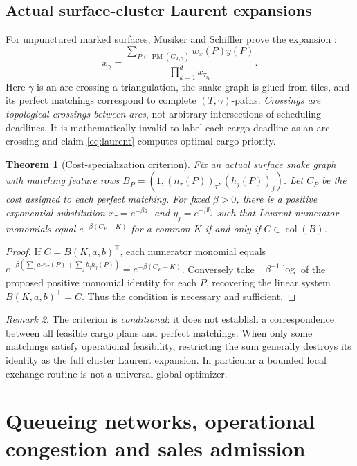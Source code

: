 \documentclass[10pt,a4paper]{article}
\newtheorem{theorem}{Theorem}[section]
\theoremstyle{definition}\newtheorem{definition}[theorem]{Definition}
\theoremstyle{remark}\newtheorem{remark}[theorem]{Remark}
\newcommand{\1}{\mathbbm 1}
\begin{document}
\subsection{Actual surface-cluster Laurent expansions}
For unpunctured marked surfaces, Musiker and Schiffler prove the expansion \cite{musiker}:
\begin{equation}\label{eq:laurent}x_\gamma=\frac{\sum_{P\in\operatorname{PM}(G_{T,\gamma})}w_x(P)y(P)}{\prod_{k=1}^d x_{\tau_{i_k}}}.
\end{equation}
Here $\gamma$ is an arc crossing a triangulation, the snake graph is glued from tiles, and its perfect matchings correspond to complete $(T,\gamma)$-paths. \emph{Crossings are topological crossings between arcs}, not arbitrary intersections of scheduling deadlines. It is mathematically invalid to label each cargo deadline as an arc crossing and claim \eqref{eq:laurent} computes optimal cargo priority.

\begin{theorem}[Cost-specialization criterion]\label{thm:column}
Fix an actual surface snake graph with matching feature rows $B_P=(1,(n_\tau(P))_\tau,(h_j(P))_j)$. Let $C_P$ be the cost assigned to each perfect matching. For fixed $\beta>0$, there is a positive exponential substitution $x_\tau=e^{-\beta a_\tau}$ and $y_j=e^{-\beta b_j}$ such that Laurent \emph{numerator} monomials equal $e^{-\beta(C_P-K)}$ for a common $K$ if and only if $C\in\operatorname{col}(B)$.
\end{theorem}
\begin{proof}
If $C=B(K,a,b)^\top$, each numerator monomial equals $e^{-\beta(\sum_\tau a_\tau n_\tau(P)+\sum_jb_jh_j(P))}=e^{-\beta(C_P-K)}$. Conversely take $-\beta^{-1}\log$ of the proposed positive monomial identity for each $P$, recovering the linear system $B(K,a,b)^\top=C$. Thus the condition is necessary and sufficient.
\end{proof}
\begin{remark}The criterion is \emph{conditional}: it does not establish a correspondence between all feasible cargo plans and perfect matchings. When only some matchings satisfy operational feasibility, restricting the sum generally destroys its identity as the full cluster Laurent expansion. In particular a bounded local exchange routine is not a universal global optimizer.\end{remark}

\section{Queueing networks, operational congestion and sales admission}
\end{document}
